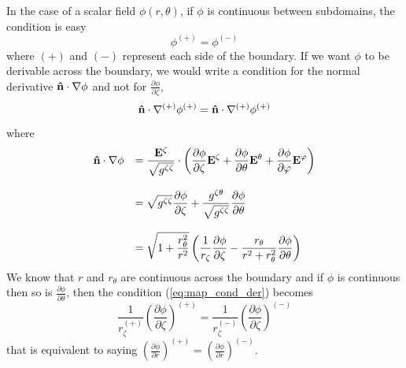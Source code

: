 In the case of a scalar field $\phi(r,\theta)$, if $\phi$ is continuous between subdomains, the condition is easy
\begin{equation}
\phi^{(+)}=\phi^{(-)}
\end{equation}
where $(+)$ and $(-)$ represent each side of the boundary. If we want $\phi$ to be derivable across the boundary, 
we would write a condition for the normal derivative $\mathbf{\hat n}\cdot\nabla\phi$ and not for 
$\frac{\partial\phi}{\partial\zeta}$,
\begin{equation}
\label{eq:map_cond_der}
\mathbf{\hat n}\cdot\nabla^{(+)}\phi^{(+)}=\mathbf{\hat n}\cdot\nabla^{(+)}\phi^{(+)}
\end{equation}
where 
\begin{equation}
\begin{array}{rl}
\mathbf{\hat n}\cdot\nabla\phi&
\displaystyle =\frac{\mathbf{E}^\zeta}{\sqrt{g^{\zeta\zeta}}}\cdot\left(\frac{\partial\phi}{\partial\zeta}\mathbf{E}^\zeta+
\frac{\partial\phi}{\partial\theta}\mathbf{E}^\theta+\frac{\partial\phi}{\partial\varphi}\mathbf{E}^\varphi\right)\\
&\\&
\displaystyle =\sqrt{g^{\zeta\zeta}}\frac{\partial\phi}{\partial\zeta}+\frac{g^{\zeta\theta}}{\sqrt{g^{\zeta\zeta}}}
\frac{\partial\phi}{\partial\theta}\\
&\\&
\displaystyle =\sqrt{1+\frac{r_\theta^2}{r^2}}\left(\frac{1}{r_\zeta}\frac{\partial\phi}{\partial\zeta}-
\frac{r_\theta}{r^2+r_\theta^2}\frac{\partial\phi}{\partial\theta}\right)
\end{array}
\end{equation}
We know that $r$ and $r_\theta$ are continuous across the boundary and if $\phi$ is continuous then so is
$\frac{\partial\phi}{\partial\theta}$, then the condition (\ref{eq:map_cond_der}) becomes
\begin{equation}
\frac{1}{r_\zeta^{(+)}}\left(\frac{\partial\phi}{\partial\zeta}\right)^{(+)}=
\frac{1}{r_\zeta^{(-)}}\left(\frac{\partial\phi}{\partial\zeta}\right)^{(-)}
\end{equation}
that is equivalent to saying $\displaystyle\left(\frac{\partial\phi}{\partial r}\right)^{(+)}=
\left(\frac{\partial\phi}{\partial r}\right)^{(-)}$.

